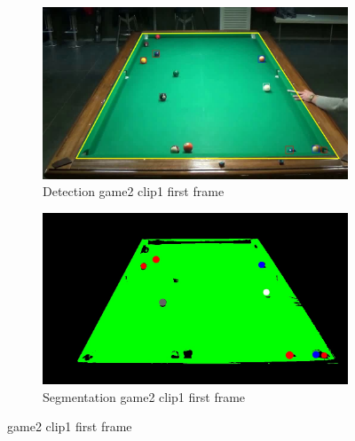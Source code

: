 \begin{figure}[H]
    \centering
    \begin{subfigure}[b]{0.4\textwidth}
        \centering
        \includegraphics[width=\textwidth]{images/Detection/game2_clip1_detected_balls_first_frame.jpg}
        \caption{Detection game2 clip1 first frame}
        \label{fig: game2_clip1_first_frame_detected}
    \end{subfigure}
    \begin{subfigure}[b]{0.4\textwidth}
        \centering
        \includegraphics[width=\textwidth]{images/Segmentation/game2_clip1_segmented_balls_first_frame.jpg}
        \caption{Segmentation game2 clip1 first frame}
		\label{fig: game2_clip1_first_frame_segmented}
    \end{subfigure}
	\caption{game2 clip1 first frame}
\end{figure}

